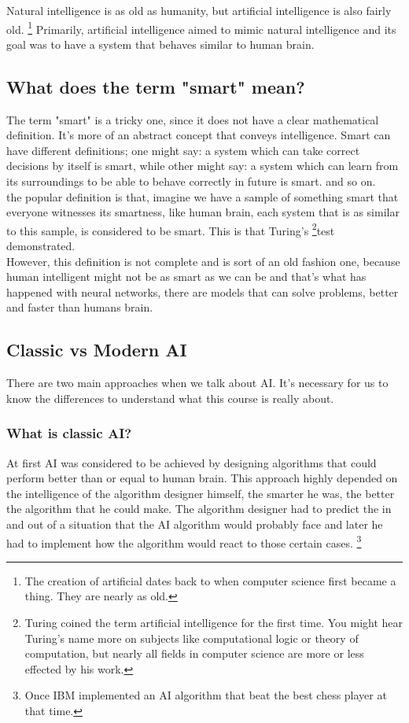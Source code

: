 \documentclass[twocolumn,a4paper, 10pt]{article}
\begin{document}
		Natural intelligence is as old as humanity, but artificial intelligence is also fairly old. \footnote[1]{
			The creation of artificial dates back to when computer science first became a thing. They are nearly as old.
		}
		Primarily, artificial intelligence aimed to mimic natural intelligence and its goal was 
		to have a system that behaves similar to human brain.

	\subsection{What does the term "smart" mean?}
		The term "smart" is a tricky one, since it does not have a clear mathematical definition.
		It's more of an abstract concept that conveys intelligence.
		Smart can have different definitions; one might say: a system which can take correct 
		decisions by itself is smart, while other might say: a system which can learn from its 
		surroundings to be able to behave correctly in future is smart. and so on. \\ 
		the popular definition is that, imagine we have a sample of something smart that everyone 
		witnesses its smartness, like human brain, each system that is as similar to this sample,
		is considered to be smart. This is that Turing's \footnote[2]{Turing coined the term 
		artificial intelligence for the first time. You might hear Turing's name more on subjects like
		computational logic or theory of computation, but nearly all fields in computer science are 
		more or less effected by his work. }test demonstrated. \\ 
		However, this definition is not complete and is sort of an old fashion one, because 
		human intelligent might not be as smart as we can be and that's what has happened 
		with neural networks, there are models that can solve problems, better and faster than humans brain.

	\subsection{Classic vs Modern AI}
		There are two main approaches when we talk about AI. It's necessary for us to know the 
		differences to understand what this course is really about.
		\subsubsection{What is classic AI?}
			At first AI was considered to be achieved by designing algorithms 
			that could perform better than or equal to human brain. This approach highly 
			depended on the intelligence of the algorithm designer himself, the smarter he was, 
			the better the algorithm that he could make. The algorithm designer had to predict the in and out
			of a situation that the AI algorithm would probably face and later he had to implement 
			how the algorithm would react to those certain cases. \footnote[1]{
				Once IBM implemented an AI algorithm that beat the best chess player at that time.
			}
\end{document}
